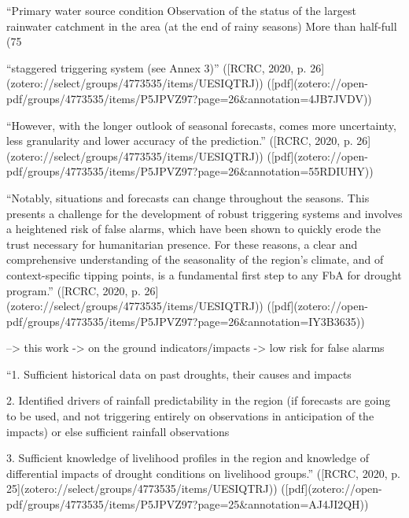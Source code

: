 {%
“Primary water source condition Observation of the status of the largest rainwater catchment in the area (at the end of rainy seasons) More than half-full (75%

“staggered triggering system (see Annex 3)” ([RCRC, 2020, p. 26](zotero://select/groups/4773535/items/UESIQTRJ)) ([pdf](zotero://open-pdf/groups/4773535/items/P5JPVZ97?page=26&annotation=4JB7JVDV))

“However, with the longer outlook of seasonal forecasts, comes more uncertainty, less granularity and lower accuracy of the prediction.” ([RCRC, 2020, p. 26](zotero://select/groups/4773535/items/UESIQTRJ)) ([pdf](zotero://open-pdf/groups/4773535/items/P5JPVZ97?page=26&annotation=55RDIUHY))

“Notably, situations and forecasts can change throughout the seasons. This presents a challenge for the development of robust triggering systems and involves a heightened risk of false alarms, which have been shown to quickly erode the trust necessary for humanitarian presence. For these reasons, a clear and comprehensive understanding of the seasonality of the region’s climate, and of context-specific tipping points, is a fundamental first step to any FbA for drought program.” ([RCRC, 2020, p. 26](zotero://select/groups/4773535/items/UESIQTRJ)) ([pdf](zotero://open-pdf/groups/4773535/items/P5JPVZ97?page=26&annotation=IY3B3635))

--> this work -> on the ground indicators/impacts -> low risk for false alarms

“1. Sufficient historical data on past droughts, their causes and impacts 

2. Identified drivers of rainfall predictability in the region (if forecasts are going to be used, and not triggering entirely on observations in anticipation of the impacts) or else sufficient rainfall observations 

3. Sufficient knowledge of livelihood profiles in the region and knowledge of differential impacts of drought conditions on livelihood groups.” ([RCRC, 2020, p. 25](zotero://select/groups/4773535/items/UESIQTRJ)) ([pdf](zotero://open-pdf/groups/4773535/items/P5JPVZ97?page=25&annotation=AJ4JI2QH))




}
